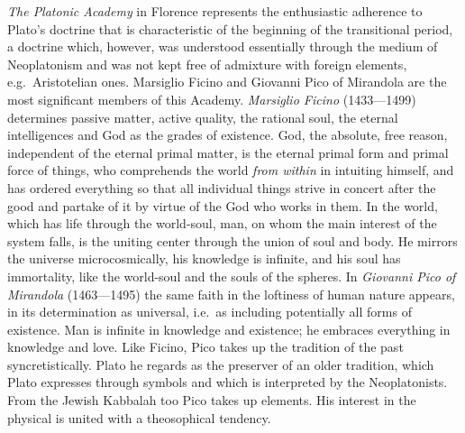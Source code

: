 \emph{The Platonic Academy} in Florence represents the enthusiastic
adherence to Plato's doctrine that is characteristic of the beginning
of the transitional period, a doctrine which, however, was understood
essentially through the medium of Neoplatonism and was not kept free
of admixture with foreign elements, e.g.\ Aristotelian ones. Marsiglio
Ficino and Giovanni Pico of Mirandola are the most significant members
of this Academy. \emph{Marsiglio Ficino} (1433---1499) determines
passive matter, active quality, the rational soul, the eternal
intelligences and God as the grades of existence. God, the absolute,
free reason, independent of the eternal primal matter, is the eternal
primal form and primal force of things, who comprehends the world
\emph{from within} in intuiting himself, and has ordered everything so
that all individual things strive in concert after the good and partake
of it by virtue of the God who works in them. In the world, which has
life through the world-soul, man, on whom the main interest of the
system falls, is the uniting center through the union of soul and
body. He mirrors the universe microcosmically, his knowledge
is infinite, and his soul has immortality, like the world-soul and the
souls of the spheres. In \emph{Giovanni Pico of Mirandola} (1463---1495)
the same faith in the loftiness of human nature appears, in its
determination as universal, i.e.\ as including potentially all forms of
existence. Man is infinite in knowledge and existence; he embraces
everything in knowledge and love. Like Ficino, Pico takes up the
tradition of the past syncretistically. Plato he regards as the
preserver of an older tradition, which Plato expresses through symbols
and which is interpreted by the Neoplatonists.
From the Jewish Kabbalah too Pico takes up elements. His interest in
the physical is united with a theosophical tendency.


